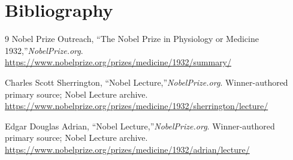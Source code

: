 \section{Bibliography}

\begin{thebibliography}{9}
Nobel Prize Outreach, ``The Nobel Prize in Physiology or Medicine 1932,''\emph{NobelPrize.org}.\newline
\url{https://www.nobelprize.org/prizes/medicine/1932/summary/}

Charles Scott Sherrington, ``Nobel Lecture,''\emph{NobelPrize.org}. Winner-authored primary source; Nobel Lecture archive.\newline
\url{https://www.nobelprize.org/prizes/medicine/1932/sherrington/lecture/}

Edgar Douglas Adrian, ``Nobel Lecture,''\emph{NobelPrize.org}. Winner-authored primary source; Nobel Lecture archive.\newline
\url{https://www.nobelprize.org/prizes/medicine/1932/adrian/lecture/}
\end{thebibliography}
